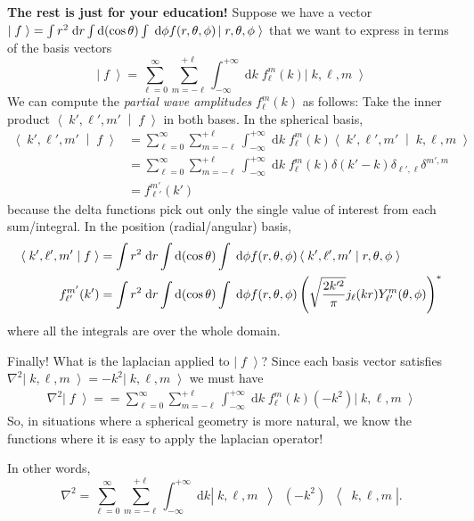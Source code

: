 \documentclass[answers]{exam}\newcommand{\repositoryInformationSetup}{     \usepackage[dvipsnames]{xcolor}     \usepackage[ angle=90, color=black, opacity=1, scale=2, ]{background}      \SetBgPosition{current page.west}      \SetBgVshift{-4.5mm}      \backgroundsetup{contents={{\color{green}\texttt{-{}-} differs from commit \texttt{f3526e2} in 0 files}}} } \newcommand{\commit}{{{\color{green}f3526e2}}}\usepackage{amsmath}
\newcommand{\grad}{\ensuremath{\nabla}\xspace}
\providecommand{\id}{}
\renewcommand{\id}[1]{\ensuremath{\; \mathrm{d}#1}}
\newcommand{\ket}[1]{\ensuremath{\left|\;#1\;\right\rangle}}
\newcommand{\bracket}[2]{\ensuremath{\left\langle\;#1\;\middle|\;#2\;\right\rangle}}
\let\braket\bracket
\newcommand{\operator}[3]{\ensuremath{\left|\;#1\;\middle\rangle\; #2\; \middle\langle\;#3\;\right|}}
\begin{document}
\begin{questions}
\begin{parts}
\end{parts}
{\bf The rest is just for your education!}
Suppose we have a vector $\ket{f} = \int r^2 \id{r} \int {\rm d}(\cos\theta) \int \id{\phi} f(r,\theta,\phi) \ket{r,\theta,\phi}$ that we want to express in terms of the basis vectors
	\begin{equation}
		\label{eq:partial wave decomposition}
		\ket{f} = \sum_{\ell=0}^{\infty} \sum_{m=-\ell}^{+\ell} \int_{-\infty}^{+\infty}\id{k}\; f_\ell^m(k) \ket{k, \ell, m}
	\end{equation}
We can compute the \emph{partial wave amplitudes} $f_\ell^m(k)$ as follows:
Take the inner product $\braket{k',\ell',m'}{f}$ in both bases.  In the spherical basis,
\begin{align*}
	\braket{k',\ell',m'}{f} 
		&= \sum_{\ell=0}^{\infty} \sum_{m=-\ell}^{+\ell} \int_{-\infty}^{+\infty}\id{k}\; f_\ell^m(k) \braket{k',\ell',m'}{k, \ell, m}
	\\	&= \sum_{\ell=0}^{\infty} \sum_{m=-\ell}^{+\ell} \int_{-\infty}^{+\infty}\id{k}\; f_\ell^m(k) \delta(k'-k)\delta_{\ell',\ell}\delta^{m',m}
	\\	&= f_{\ell'}^{m'}(k')
\end{align*}
because the delta functions pick out only the single value of interest from each sum/integral.
In the position (radial/angular) basis,
\begin{align*}
	\braket{k',\ell',m'}{f} 
		&= \int r^2 \id{r} \int {\rm d}(\cos\theta) \int \id{\phi} f(r,\theta,\phi) \braket{k',\ell',m'}{r,\theta,\phi}
	\\
	f_{\ell'}^{m'}(k')
		&= \int r^2 \id{r} \int {\rm d}(\cos\theta) \int \id{\phi} f(r,\theta,\phi) \left(\sqrt{\frac{2k'^2}{\pi}}j_\ell(k r) Y_{\ell'}^{m}(\theta,\phi)\right)^* 
\end{align*}
where all the integrals are over the whole domain.

Finally!  What is the laplacian applied to \ket{f}?  Since each basis vector satisfies $\grad^2\ket{k,\ell,m} = -k^2 \ket{k,\ell,m}$ we must have
\begin{align}
	\grad^2 \ket{f} = 
			= \sum_{\ell=0}^{\infty} \sum_{m=-\ell}^{+\ell} \int_{-\infty}^{+\infty}\id{k}\;  f_\ell^m(k) (-k^2) \ket{k, \ell, m}
\end{align}
So, in situations where a spherical geometry is more natural, we know the functions where it is easy to apply the laplacian operator!

In other words,
\begin{equation}
	\grad^2 = \sum_{\ell=0}^{\infty} \sum_{m=-\ell}^{+\ell} \int_{-\infty}^{+\infty} \id{k} \operator{k, \ell, m}{(-k^2)}{k,\ell,m}.
\end{equation}
 
\end{questions}
\end{document}
